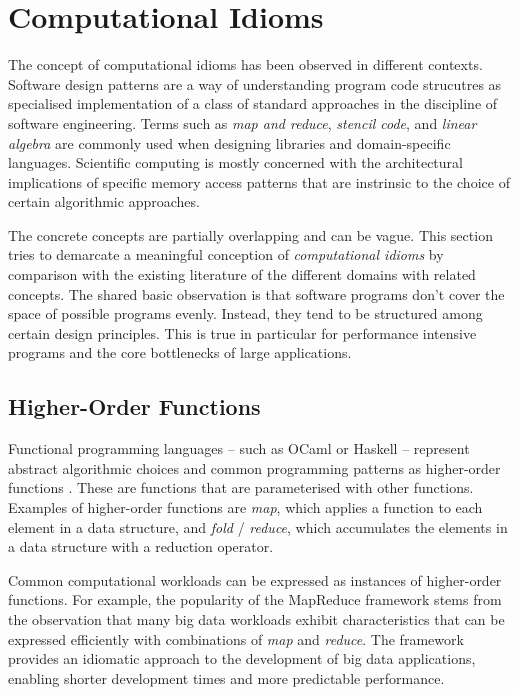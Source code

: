 \pagebreak
\section{Computational Idioms}

    The concept of computational idioms has been observed in different contexts.
    Software design patterns are a way of understanding program code
    strucutres as specialised implementation of a class of standard approaches
    in the discipline of software engineering.
    Terms such as {\em map and reduce}, {\em stencil code}, and
    {\em linear algebra} are commonly used when designing libraries and
    domain-specific languages.
    Scientific computing is mostly concerned with the architectural
    implications of specific memory access patterns that are instrinsic to
    the choice of certain algorithmic approaches.

    The concrete concepts are partially overlapping and can be vague.
    This section tries to demarcate a meaningful conception of
    {\it computational idioms} by comparison with the existing literature of the
    different domains with related concepts.
    The shared basic observation is that software programs don't cover the space
    of possible programs evenly.
    Instead, they tend to be structured among certain design principles.
    This is true in particular for performance intensive programs and the
    core bottlenecks of large applications.

\subsection{Higher-Order Functions}

    Functional programming languages -- such as OCaml or Haskell -- represent
    abstract algorithmic choices and common programming patterns as higher-order
    functions \citep{Hughes:1989:WFP:63410.63411}.
    These are functions that are parameterised with other functions.
    Examples of higher-order functions are {\it map}, which applies a function
    to each element in a data structure, and {\it fold} / {\it reduce}, which
    accumulates the elements in a data structure with a reduction operator.

    Common computational workloads can be expressed as instances of
    higher-order functions.
    For example, the popularity of the MapReduce framework
    \citep{Dean2008MapReduce} stems from the observation that many big data
    workloads exhibit characteristics that can be expressed efficiently with
    combinations of {\it map} and {\it reduce}.
    The framework provides an idiomatic approach to the development of big
    data applications, enabling shorter development times and more predictable
    performance.

